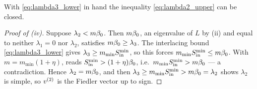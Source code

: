 \noindent With \eqref{eq:lambda3_lower} in hand the inequality
\eqref{eq:lambda2_upper} can be closed.

\begin{proof}[Proof of (iv)]
Suppose $\lambda_2<m\beta_0$. Then $m\beta_0$, an eigenvalue of $L$ by
(ii) and equal to neither $\lambda_1=0$ nor $\lambda_2$, satisfies
$m\beta_0\ge\lambda_3$. The interlacing bound \eqref{eq:lambda3_lower} gives
$\lambda_3\ge m_{\min}S_{\mathrm{in}}^{\min}$, so this forces $m_{\min}S_{\mathrm{in}}^{\min}\le m\beta_0$.
With $m=m_{\min}(1+\eta)$,  reads $S_{\mathrm{in}}^{\min}>(1+\eta)\beta_0$, i.e.\
$m_{\min}S_{\mathrm{in}}^{\min}>m\beta_0$ --- a contradiction. Hence $\lambda_2=m\beta_0$, and then
$\lambda_3\ge m_{\min}S_{\mathrm{in}}^{\min}>m\beta_0=\lambda_2$ shows $\lambda_2$ is simple, so
$v^{(2)}$ is the Fiedler vector up to sign.
\end{proof}
